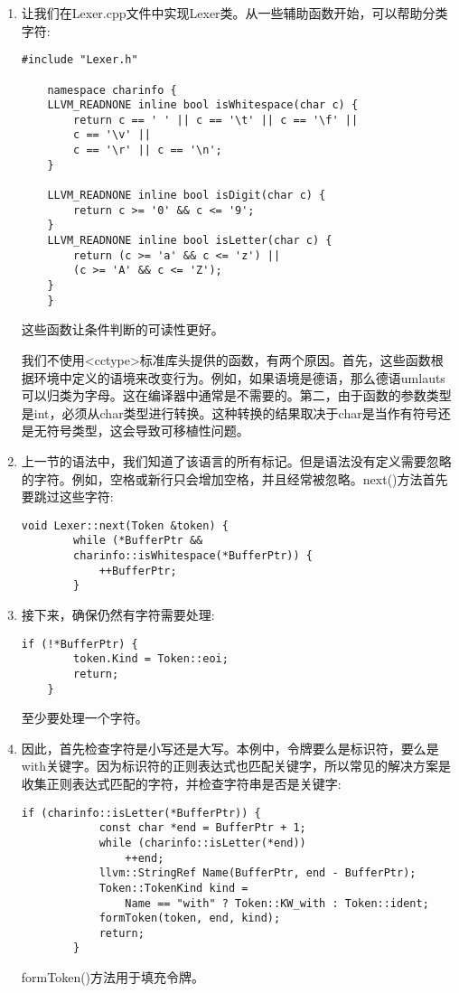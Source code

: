 \begin{enumerate}
	\item 让我们在Lexer.cpp文件中实现Lexer类。从一些辅助函数开始，可以帮助分类字符:
	\begin{lstlisting}[caption={}]
	#include "Lexer.h"
	
	namespace charinfo {
	LLVM_READNONE inline bool isWhitespace(char c) {
		return c == ' ' || c == '\t' || c == '\f' ||
		c == '\v' ||
		c == '\r' || c == '\n';
	}

	LLVM_READNONE inline bool isDigit(char c) {
		return c >= '0' && c <= '9';
	}
	LLVM_READNONE inline bool isLetter(char c) {
		return (c >= 'a' && c <= 'z') ||
		(c >= 'A' && c <= 'Z');
	}
	}
	\end{lstlisting}
	这些函数让条件判断的可读性更好。
	\begin{tcolorbox}[colback=blue!5!white,colframe=blue!75!black,title=Note]
		我们不使用<cctype>标准库头提供的函数，有两个原因。首先，这些函数根据环境中定义的语境来改变行为。例如，如果语境是德语，那么德语umlauts可以归类为字母。这在编译器中通常是不需要的。第二，由于函数的参数类型是int，必须从char类型进行转换。这种转换的结果取决于char是当作有符号还是无符号类型，这会导致可移植性问题。
	\end{tcolorbox}

	\item 上一节的语法中，我们知道了该语言的所有标记。但是语法没有定义需要忽略的字符。例如，空格或新行只会增加空格，并且经常被忽略。next()方法首先要跳过这些字符:
	\begin{lstlisting}[caption={}]
	void Lexer::next(Token &token) {
		while (*BufferPtr &&
		charinfo::isWhitespace(*BufferPtr)) {
			++BufferPtr;
		}
	\end{lstlisting}

	\item 接下来，确保仍然有字符需要处理:
	\begin{lstlisting}[caption={}]
	if (!*BufferPtr) {
		token.Kind = Token::eoi;
		return;
	}
	\end{lstlisting}
	至少要处理一个字符。
	
	\item 因此，首先检查字符是小写还是大写。本例中，令牌要么是标识符，要么是with关键字。因为标识符的正则表达式也匹配关键字，所以常见的解决方案是收集正则表达式匹配的字符，并检查字符串是否是关键字:
	\begin{lstlisting}[caption={}]
		if (charinfo::isLetter(*BufferPtr)) {
			const char *end = BufferPtr + 1;
			while (charinfo::isLetter(*end))
				++end;
			llvm::StringRef Name(BufferPtr, end - BufferPtr);
			Token::TokenKind kind =
				Name == "with" ? Token::KW_with : Token::ident;
			formToken(token, end, kind);
			return;
		}
	\end{lstlisting}
	formToken()方法用于填充令牌。


\end{enumerate}
